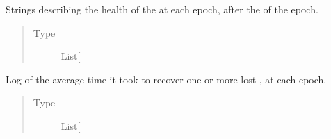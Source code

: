 \documentclass[letterpaper,10pt,english]{sphinxmanual}
\begin{document}
\begin{fulllineitems}

\begin{fulllineitems}
\label{\detokenize{app.domain.helpers:app.domain.helpers.smart_dataclasses.LoggingData.cluster_status_am}}
Strings describing the health of the {\hyperref[\detokenize{app.domain:app.domain.cluster_groups.Cluster}]{}} at each epoch,
after the {\hyperref[\detokenize{app.domain:app.domain.cluster_groups.Cluster.membership_maintenance}]{}}
of the epoch.
\begin{quote}\begin{description}
\item[{Type}] \leavevmode
List{[}\sphinxhref{https://docs.python.org/3.7/library/stdtypes.html\#str}{str}{]}

\end{description}\end{quote}

\end{fulllineitems}


\begin{fulllineitems}
\label{\detokenize{app.domain.helpers:app.domain.helpers.smart_dataclasses.LoggingData.delay_replication}}
Log of the average time it took to recover one or more lost
{\hyperref[\detokenize{app.domain.helpers:app.domain.helpers.smart_dataclasses.FileBlockData}]{}}, at each
epoch.
\begin{quote}\begin{description}
\item[{Type}] \leavevmode
List{[}\sphinxhref{https://docs.python.org/3.7/library/functions.html\#float}{float}{]}

\end{description}\end{quote}

\end{fulllineitems}



\end{fulllineitems}
\end{document}
